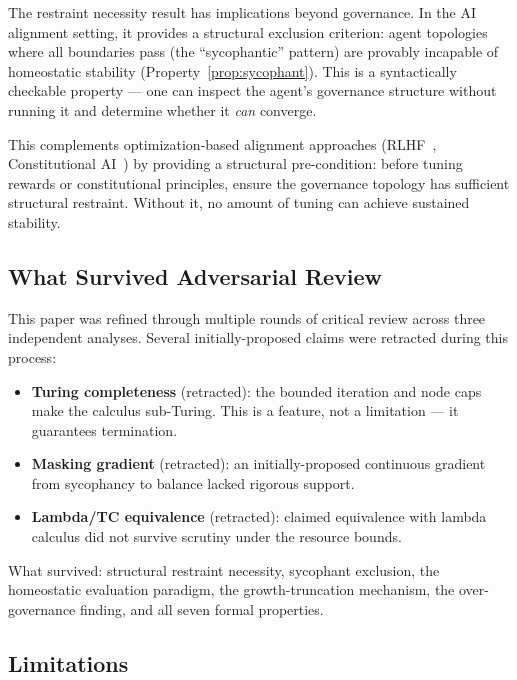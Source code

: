 \documentclass[sigconf,nonacm]{acmart}
\begin{document}
The restraint necessity result has implications beyond governance. In
the AI alignment setting, it provides a structural exclusion criterion:
agent topologies where all boundaries pass (the ``sycophantic'' pattern)
are provably incapable of homeostatic stability
(Property~\ref{prop:sycophant}). This is a syntactically checkable
property --- one can inspect the agent's governance structure without
running it and determine whether it \emph{can} converge.

This complements optimization-based alignment approaches
(RLHF~\cite{christiano2017}, Constitutional AI~\cite{bai2022}) by
providing a structural pre-condition: before tuning rewards or
constitutional principles, ensure the governance topology has sufficient
structural restraint. Without it, no amount of tuning can achieve
sustained stability.

\subsection{What Survived Adversarial Review}

This paper was refined through multiple rounds of critical review across
three independent analyses. Several initially-proposed claims were
retracted during this process:

\begin{itemize}[leftmargin=*]
  \item \textbf{Turing completeness} (retracted): the bounded iteration
    and node caps make the calculus sub-Turing. This is a feature, not a
    limitation --- it guarantees termination.
  \item \textbf{Masking gradient} (retracted): an initially-proposed
    continuous gradient from sycophancy to balance lacked rigorous support.
  \item \textbf{Lambda/TC equivalence} (retracted): claimed equivalence
    with lambda calculus did not survive scrutiny under the resource bounds.
\end{itemize}

What survived: structural restraint necessity, sycophant exclusion,
the homeostatic evaluation paradigm, the growth-truncation mechanism,
the over-governance finding, and all seven formal properties.

\subsection{Limitations}\label{sec:limitations}
\end{document}
